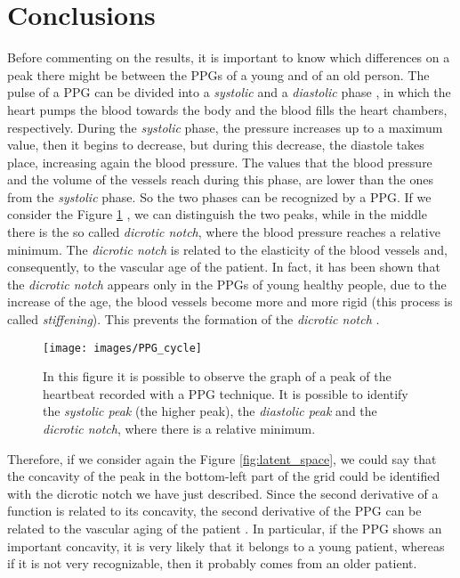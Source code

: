 \documentclass[12pt,a4paper,twocolumn]{article}
\begin{document}
		
		
		\section{Conclusions}
		Before commenting on the results, it is important to know which differences on a peak there might be between the PPGs of a young and of an old person. The pulse of a PPG can be divided into a \emph{systolic} and a \emph{diastolic} phase \cite{cardiac_cycle}, in which the heart pumps the blood towards the body and the blood fills the heart chambers, respectively. During the \emph{systolic} phase, the pressure increases up to a maximum value, then it begins to decrease, but during this decrease, the diastole takes place, increasing again the blood pressure. The values that the blood pressure and the volume of the vessels reach during this phase, are lower than the ones from the  \emph{systolic} phase.  So the two phases can be recognized by a PPG. If we consider the Figure \ref{fig:ppgcycle} \cite{ppg_cycle}, we can distinguish the two peaks, while in the middle there is the so called \emph{dicrotic notch}, where the blood pressure reaches a relative minimum. The \emph{dicrotic notch} is related to the elasticity of the blood vessels and, consequently, to the vascular age of the patient. In fact, it has been shown that  the \emph{dicrotic notch} appears only in the PPGs of young healthy people, due to the increase of the age, the blood vessels become more and more rigid (this process is called \emph{stiffening}). This prevents the formation of the \emph{dicrotic notch} \cite{dicrotic-notch}.
		
		\begin{figure}[H]
			\centering
			\texttt{[image: images/PPG\_cycle]}
			\caption{In this figure it is possible to observe the graph of a peak of the heartbeat recorded with a PPG technique. It is possible to identify the \emph{systolic peak} (the higher peak), the \emph{diastolic peak} and the \emph{dicrotic notch}, where there is a relative minimum.}
			\label{fig:ppgcycle}
		\end{figure}
		
		Therefore, if we consider again the Figure \ref{fig:latent_space}, we could say that the concavity of the peak in the bottom-left part of the grid could be identified with the dicrotic notch we have just described.
		Since the second derivative of a function is related to its concavity, the second derivative of the PPG can be related to the vascular aging of the patient \cite{review}. In particular, if the PPG shows an important concavity, it is very likely that it belongs to a young patient, whereas if it is not very recognizable, then it probably comes from an older patient.
			
\end{document}
